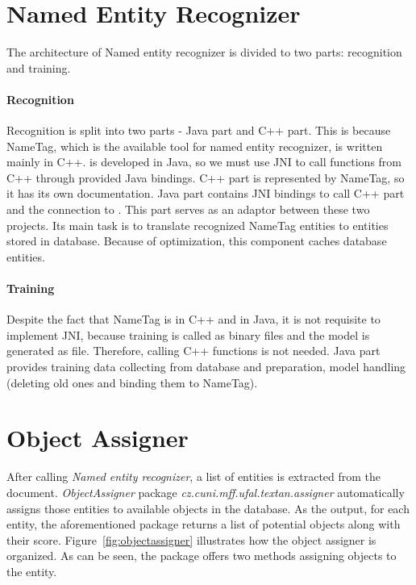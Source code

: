 \section{Named Entity Recognizer}
\label{sec:NamedEntityRecognizer}

The architecture of Named entity recognizer is divided to two parts: recognition
and training.

\paragraph{Recognition} 
Recognition is split into two parts - Java part and C++ part. This is because
NameTag, which is the available tool for named entity recognizer, is written
mainly in C++. \textan{} is developed in Java, so we must use JNI to call
functions from C++ through provided Java bindings. C++ part is represented by
NameTag, so it has its own documentation. Java part contains JNI bindings to
call C++ part and the connection to \textan{}. This part serves as an adaptor
between these two projects. Its main task is to translate recognized NameTag
entities to entities stored in \textan{} database. Because of optimization, this
component caches database entities.

\paragraph{Training}
Despite the fact that NameTag is in C++ and \textan{} in Java, it is not
requisite to implement JNI, because training is called as binary files and the
model is generated as file. Therefore, calling C++ functions is not needed. Java
part provides training data collecting from database and preparation, model
handling (deleting old ones and binding them to NameTag).

\section{Object Assigner}
\label{sec:ObjectAssigner}

After calling \emph{Named entity recognizer}, a list of entities is extracted
from the document. \emph{ObjectAssigner} package \emph{cz.\-cuni.\-mff.\-ufal.\-textan.\-assigner}
automatically assigns those entities to
available objects in the database. As the output, for each entity, the
aforementioned package returns a list of potential objects along
with their score. Figure~\ref{fig:objectassigner} illustrates 
how the object assigner is organized. As can be seen, the package offers 
two methods assigning objects to the entity.

